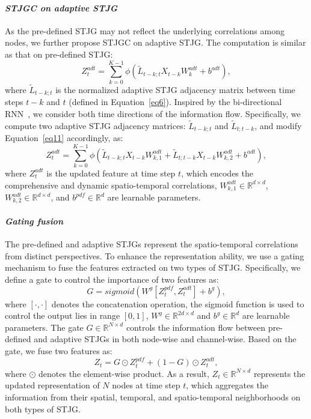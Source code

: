 \documentclass[10pt,journal,compsoc]{IEEEtran}
\begin{document}
\paragraph{\textbf{\textit{STJGC on adaptive STJG}}} As the pre-defined STJG may not reflect the underlying correlations among nodes, we further propose STJGC on adaptive STJG. The computation is similar as that on pre-defined STJG:
%
\begin{equation}
Z_t^{adt}=\sum_{k=0}^{K-1}\phi(\tilde{L}_{t-k;t}X_{t-k}W_k^{adt}+b^{adt})
\label{eq11},
\end{equation}
% 
where $ \tilde{L}_{t-k;t} $ is the normalized adaptive STJG adjacency matrix between time steps $ t-k $ and $ t $ (defined in Equation~\ref{eq6}). Inspired by the bi-directional RNN~\cite{Schuster-and-Paliwal:TSP1997}, we consider both time directions of the information flow. Specifically, we compute two adaptive STJG adjacency matrices: $ \tilde{L}_{t-k;t} $ and $ \tilde{L}_{t;t-k} $, and modify Equation~\ref{eq11} accordingly, as:
%
\begin{equation}
Z_t^{adt}=\sum_{k=0}^{K-1}\phi(\tilde{L}_{t-k;t}X_{t-k}W_{k,1}^{adt}+\tilde{L}_{t;t-k}X_{t-k}W_{k,2}^{adt}+b^{adt}),
\label{eq12}
\end{equation}
%
where $ Z_t^{adt} $ is the updated feature at time step $ t $, which encodes the comprehensive and dynamic spatio-temporal correlations, $ W_{k,1}^{adt} \in \mathbb{R}^{d \times d} $, $ W_{k,2}^{adt} \in \mathbb{R}^{d \times d} $, and $ b^{pdf} \in \mathbb{R}^{d} $ are learnable parameters.
 
\paragraph{\textbf{\textit{Gating fusion}}} \label{Gating fusion}

The pre-defined and adaptive STJGs represent the spatio-temporal correlations from distinct perspectives. To enhance the representation ability, we use a gating mechanism to fuse the features extracted on two types of STJG. Specifically, we define a gate to control the importance of two features as:
%
\begin{equation}
G=sigmoid(W^g[Z_t^{pdf},Z_t^{adt}]+b^g)
\label{eq13},
\end{equation}
%
where $ [\cdot,\cdot] $ denotes the concatenation operation, the sigmoid function is used to control the output lies in range $ [0,1] $, $ W^g \in \mathbb{R}^{2d \times d} $ and $ b^g \in \mathbb{R}^{d} $ are learnable parameters. The gate $ G \in \mathbb{R}^{N \times d} $ controls the information flow between pre-defined and adaptive STJGs in both node-wise and channel-wise. Based on the gate, we fuse two features as: 
%
\begin{equation}
Z_t=G \odot Z_t^{pdf} + (1-G) \odot Z_t^{adt}
\label{eq14},
\end{equation}
%
where $ \odot $ denotes the element-wise product. As a result, $ Z_t \in \mathbb{R}^{N \times d} $ represents the updated representation of $ N $ nodes at time step $ t $, which aggregates the information from their spatial, temporal, and spatio-temporal neighborhoods on both types of STJG.
\end{document}
